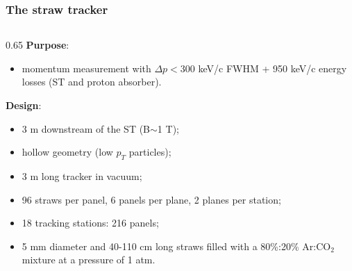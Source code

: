 \documentclass{beamer}
\begin{document}
\begin{frame}
    \frametitle{The straw tracker}
    \begin{columns}
    \begin{column}{0.65 \framewidth}
\textbf{Purpose}:
\begin{itemize}
\item momentum measurement with $\Delta p<300$ keV/c FWHM + 950 keV/c energy losses (ST and proton absorber). 
\end{itemize}
\textbf{Design}:
\begin{itemize}
    \item 3 m downstream of the ST (B$\sim$1 T);
    \item hollow geometry (low $p_T $ particles);
    \item 3 m long tracker in vacuum;
    \item 96 straws per panel, 6 panels per plane, 2 planes per station;
        \item 18 tracking stations: 216 panels;
    \item 5 mm diameter and 40-110 cm long straws filled with a 80\%:20\% Ar:CO$_2$ mixture at a pressure of 1 atm.
       
        
        
    \end{itemize}
    

\end{column}
\end{columns}
\end{frame}
\end{document}
